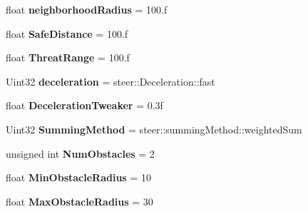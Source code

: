 \begin{DoxyCompactItemize}
\item 
\hypertarget{structsteer_1_1_behavior_parameters_acf805248354889ba068972cb97bbd9a5}{float {\bfseries neighborhood\-Radius} = 100.f}\label{structsteer_1_1_behavior_parameters_acf805248354889ba068972cb97bbd9a5}

\item 
\hypertarget{structsteer_1_1_behavior_parameters_a7c07b3201c7c07ab03a66763b319b143}{float {\bfseries Safe\-Distance} = 100.f}\label{structsteer_1_1_behavior_parameters_a7c07b3201c7c07ab03a66763b319b143}

\item 
\hypertarget{structsteer_1_1_behavior_parameters_a56704d090cdc418a38e735e5acf974af}{float {\bfseries Threat\-Range} = 100.f}\label{structsteer_1_1_behavior_parameters_a56704d090cdc418a38e735e5acf974af}

\item 
\hypertarget{structsteer_1_1_behavior_parameters_a2b37c3d3433688b033ca9faf060e0a92}{Uint32 {\bfseries deceleration} = steer\-::\-Deceleration\-::fast}\label{structsteer_1_1_behavior_parameters_a2b37c3d3433688b033ca9faf060e0a92}

\item 
\hypertarget{structsteer_1_1_behavior_parameters_a5a959890c9378786a79c381788c5d132}{float {\bfseries Deceleration\-Tweaker} = 0.\-3f}\label{structsteer_1_1_behavior_parameters_a5a959890c9378786a79c381788c5d132}

\item 
\hypertarget{structsteer_1_1_behavior_parameters_a53ebf58e2a16e6f13ef7f0076648913d}{Uint32 {\bfseries Summing\-Method} = steer\-::summing\-Method\-::weighted\-Sum}\label{structsteer_1_1_behavior_parameters_a53ebf58e2a16e6f13ef7f0076648913d}

\item 
\hypertarget{structsteer_1_1_behavior_parameters_a10b5bfa4a42846422dc459e1d358b027}{unsigned int {\bfseries Num\-Obstacles} = 2}\label{structsteer_1_1_behavior_parameters_a10b5bfa4a42846422dc459e1d358b027}

\item 
\hypertarget{structsteer_1_1_behavior_parameters_a0ca8791227f209f182036e8fceae8469}{float {\bfseries Min\-Obstacle\-Radius} = 10}\label{structsteer_1_1_behavior_parameters_a0ca8791227f209f182036e8fceae8469}

\item 
\hypertarget{structsteer_1_1_behavior_parameters_ad39f6249e4599a8175c6119b6da63feb}{float {\bfseries Max\-Obstacle\-Radius} = 30}\label{structsteer_1_1_behavior_parameters_ad39f6249e4599a8175c6119b6da63feb}


\end{DoxyCompactItemize}
